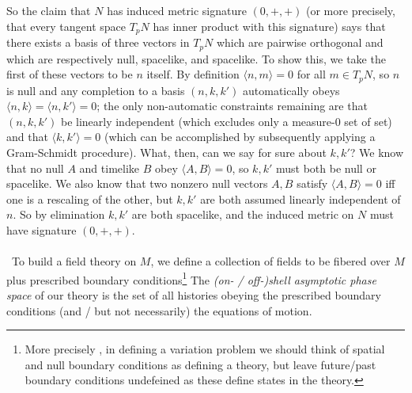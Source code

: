 \documentclass[11pt,letterpaper]{article}
\begin{document}
So the claim that $N$ has induced metric signature $(0,+,+)$ (or more precisely, that every tangent space $T_p N$ has inner product with this signature) says that there exists a basis of three vectors in $T_p N$ which are pairwise orthogonal and which are respectively null, spacelike, and spacelike. To show this, we take the first of these vectors to be $n$ itself. By definition $\langle n, m \rangle = 0$ for all $m \in T_p N$, so $n$ is null and any completion to a basis $(n, k, k')$ automatically obeys $\langle n, k \rangle = \langle n, k' \rangle = 0$; the only non-automatic constraints remaining are that $(n, k, k')$ be linearly independent (which excludes only a measure-0 set of set) and that $\langle k, k' \rangle = 0$ (which can be accomplished by subsequently applying a Gram-Schmidt procedure). What, then, can we say for sure about $k, k'$? We know that no null $A$ and timelike $B$ obey $\langle A, B \rangle = 0$, so $k, k'$ must both be null or spacelike. We also know that two nonzero null vectors $A, B$ satisfy $\langle A, B \rangle = 0$ iff one is a rescaling of the other, but $k, k'$ are both assumed linearly independent of $n$. So by elimination $k, k'$ are both spacelike, and the induced metric on $N$ must have signature $(0,+,+)$.
\\
\\
\
To build a field theory on $M$, we define a collection of fields to be fibered over $M$ plus prescribed boundary conditions\footnote{More precisely \cite{Harlow:2019yfa}, in defining a variation problem we should think of spatial and null boundary conditions as defining a theory, but leave future/past boundary conditions undefeined as these define states in the theory.} The \textit{(on- / off-)shell asymptotic phase space} of our theory is the set of all histories obeying the prescribed boundary conditions (and / but not necessarily) the equations of motion.
\end{document}

